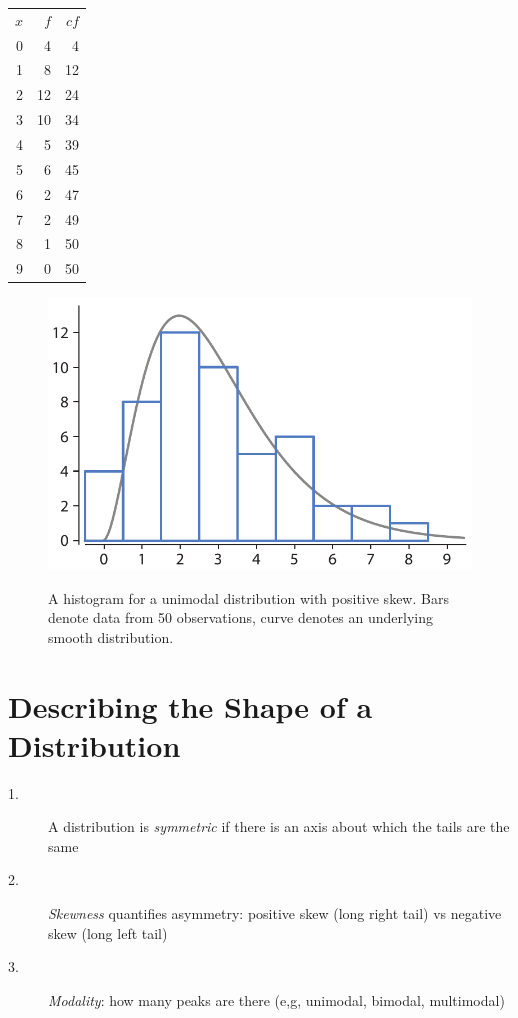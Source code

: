 \documentclass{tufte-handout}
\begin{document}
\begin{margintable}[4.0in]
  \centering
  \selectfont
  \begin{tabular}{rrr}
    \toprule
    $x$ & $f$ & $cf$\\
     0  &   4 &    4\\
     1  &   8 &   12\\
     2 &   12&    24\\
     3 &   10&    34\\
     4 &    5 &   39\\
     5 &    6 &   45\\
     6 &    2 &   47\\
     7 &    2 &   49\\
     8 &    1 &   50\\
     9 &    0 &   50\\
    \bottomrule
  \end{tabular}
  \label{tab:normaltab}
\end{margintable}

\begin{figure}%
  \includegraphics[width=\linewidth]{images/handout1_hist}%
  \label{fig:fullfig}%
  \caption{A histogram for a unimodal distribution with positive skew. Bars denote data from 50 observations, curve denotes an underlying smooth distribution.}
\end{figure}

\section{Describing the Shape of a Distribution}
\begin{fullwidth}
\begin{description}
\item[1.] A distribution is \emph{symmetric} if there is an axis about which the tails are the same\\
\item[2.] \emph{Skewness} quantifies asymmetry: positive skew (long right tail) vs negative skew (long left tail)\\
\item[3.] \emph{Modality}: how many peaks are there (e,g, unimodal, bimodal, multimodal)\\
\end{description}
\end{fullwidth}
\end{document}
